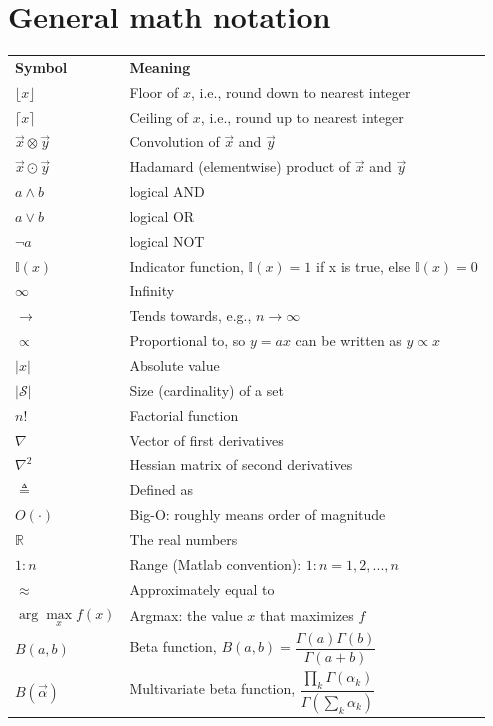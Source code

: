 \documentclass[a4paper,11pt]{article}
\providecommand{\abs}[1]{\lvert#1\rvert}
\begin{document}
\section*{General math notation}

\begin{longtable}{ll}
	\hline\noalign{\smallskip}
	\textbf{Symbol} & \textbf{Meaning} \\
	\noalign{\smallskip}\hline\noalign{\smallskip}
	$\lfloor x \rfloor$ & Floor of $x$, i.e., round down to nearest integer\\
	$\lceil x \rceil$ & Ceiling of $x$, i.e., round up to nearest integer\\
	$\vec{x} \otimes \vec{y}$ & Convolution of $\vec{x}$ and $\vec{y}$\\
	$\vec{x} \odot \vec{y}$ & Hadamard (elementwise) product of $\vec{x}$ and $\vec{y}$\\
	$a \wedge b$ & logical AND\\
	$a \vee b$ & logical OR\\
	$\neg a$ & logical NOT\\
	$\mathbb{I}(x)$ & Indicator function, $\mathbb{I}(x)=1$ if x is true, else $\mathbb{I}(x)=0$\\
	$\infty$ & Infinity\\
	$\rightarrow$ & Tends towards, e.g., $n \rightarrow \infty$\\
	$\propto$ &Proportional to, so $y = ax$ can be written as $y \propto x$\\
	$\abs{x}$ & Absolute value\\
	$\abs{\mathcal{S}}$ & Size (cardinality) of a set\\
	$n!$ & Factorial function\\
	$\nabla$ & Vector of first derivatives\\
	$\nabla^2$ & Hessian matrix of second derivatives\\
	$\triangleq$ & Defined as\\
	$O(\cdot)$ & Big-O: roughly means order of magnitude\\
	$\mathbb{R}$ & The real numbers\\
	$1:n$ & Range (Matlab convention): $1:n = {1, 2,...,n}$\\
	$\approx$ & Approximately equal to\\
	$\arg\max\limits_x f(x)$ & Argmax: the value $x$ that maximizes $f$\\
	$B(a,b)$ & Beta function, $B(a,b)=\dfrac{\Gamma(a)\Gamma(b)}{\Gamma(a+b)}$\\
	$B(\vec{\alpha})$ & Multivariate beta function, $\dfrac{\prod\limits_k \Gamma(\alpha_k)}{\Gamma(\sum\limits_k \alpha_k)}$\\

\end{longtable}
\end{document}
